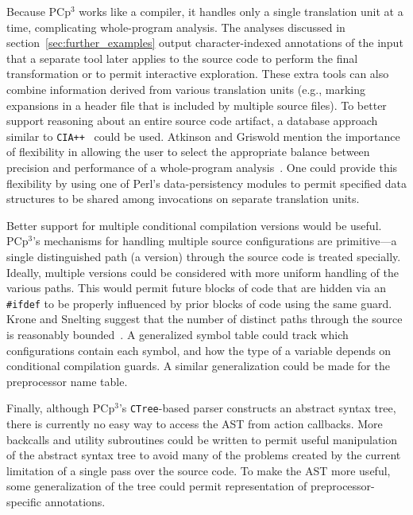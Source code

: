 \documentclass{article}
\newcommand{\pcp}{\mbox{\textsf{PCp}$^3$}}
\newcommand{\Perl}{\mbox{Perl}}
\newcommand{\C}{\mbox{C}}
\newcommand{\ppd}[1]{\texttt{\##1}}
\newcommand{\eg}{e.g.,}
\begin{document}
Because \pcp{} works like a compiler, it handles only a single
translation unit at a time, complicating whole-program analysis.  The
analyses discussed in section~\ref{sec:further_examples} output
character-indexed annotations of the input that a separate tool later
applies to the source code to perform the final transformation or to permit
interactive exploration.  These extra tools can also combine
information derived from various translation units (\eg{} marking
expansions in a header file that is included by multiple source files).
To better support reasoning about an entire source code artifact, a
database approach similar to \texttt{CIA++}~\cite{CIA++90} could be
used.  Atkinson and Griswold mention the importance of flexibility in
allowing the user to select the appropriate balance between precision
and performance of a whole-program analysis~\cite{Atkinson96}.  One
could provide this flexibility by using one of \Perl{}'s
data-persistency modules to permit specified data structures to be shared among
invocations on separate translation units.

Better support for multiple conditional compilation versions would be
useful. \pcp{}'s mechanisms for
handling multiple source configurations are primitive---a single
distinguished path (a version) through the source code is treated
specially.  Ideally, multiple versions could be considered with more
uniform handling of the various paths.  This would permit future blocks
of code that are hidden via an \ppd{ifdef} to be properly influenced by prior
blocks of code using the same guard.  Krone and Snelting suggest
that the number of distinct paths through the source is reasonably
bounded~\cite{Krone94}.  A generalized symbol table could track which
configurations contain each symbol, and how the type of a variable
depends on conditional compilation guards.  A similar generalization
could be made for the preprocessor name table.


Finally, although \pcp{}'s \texttt{CTree}-based parser constructs an abstract syntax
tree, there is currently no easy way to access the AST from action
callbacks.  More backcalls and utility subroutines could be
written to permit useful manipulation of the abstract syntax tree to
avoid many of the problems created by the current limitation of a single
pass over the source code.  To make the AST more useful, some
generalization of the tree could permit representation of
preprocessor-specific annotations.
\end{document}
